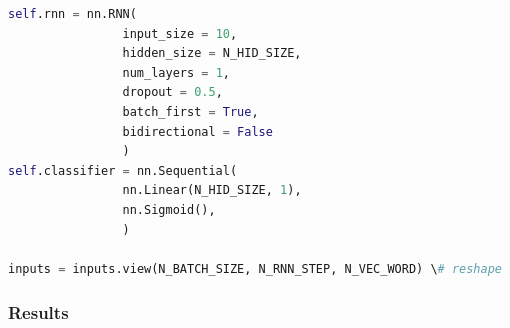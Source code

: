 \documentclass[11pt, a4paper]{article} %
\begin{document}
\begin{lstlisting}[language = python]
self.rnn = nn.RNN(
                input_size = 10,
                hidden_size = N_HID_SIZE,
                num_layers = 1,
                dropout = 0.5,
                batch_first = True,
                bidirectional = False
                )
self.classifier = nn.Sequential(
                nn.Linear(N_HID_SIZE, 1),
                nn.Sigmoid(),
                )

inputs = inputs.view(N_BATCH_SIZE, N_RNN_STEP, N_VEC_WORD) \# reshape
\end{lstlisting}

\subsubsection{Results }
\end{document}
